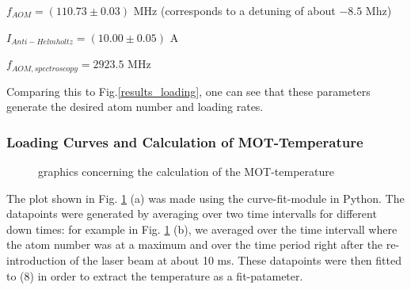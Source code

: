 \documentclass[12pt, a4paper]{article}
\begin{document}
\bigskip
$f_{AOM}=(110.73 \pm 0.03)$ MHz (corresponds to a detuning of about $-8.5$ Mhz)

$I_{Anti-Helmholtz}=(10.00 \pm 0.05)$ A

$f_{AOM, spectroscopy}=2923.5$ MHz

\bigskip
Comparing this to Fig.\ref{results_loading}, one can see that these parameters generate the desired atom number and loading rates.

\subsubsection{Loading Curves and Calculation of MOT-Temperature}

\begin{figure}[h]
\centering
\caption{graphics concerning the calculation of the MOT-temperature}
	\label{erf_fit}
\end{figure}

The plot shown in Fig. \ref{erf_fit} (a) was made using the curve-fit-module in
Python. The datapoints were generated by averaging over two time intervalls for
different down times: for example in Fig. \ref{erf_fit} (b), we averaged over the
time intervall where the atom number was at a maximum and over the time period
right after the re-introduction of the laser beam at about 10 ms. These datapoints were then fitted to (8) in order to extract the temperature as a fit-patameter.
\end{document}
